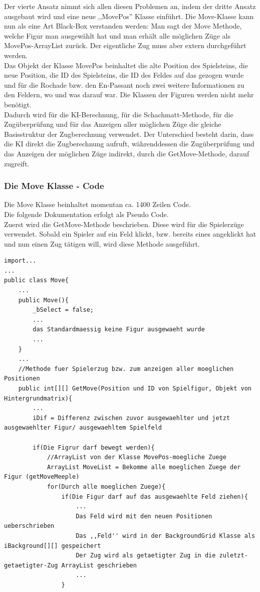 \documentclass[12pt,a4paper]{article}
\begin{document}
{Der vierte Ansatz nimmt sich allen diesen Problemen an, indem der dritte Ansatz ausgebaut wird und eine neue ,,MovePos'' Klasse einführt. Die Move-Klasse kann nun als eine Art Black-Box verstanden werden: Man sagt der Move Methode, welche Figur man ausgewählt hat und man erhält alle möglichen Züge als MovePos-ArrayList zurück. Der eigentliche Zug muss aber extern durchgeführt werden. \\
Das Objekt der Klasse MovePos beinhaltet die alte Position des Spielsteins, die neue Position, die ID des Spielsteins, die ID des Feldes auf das gezogen wurde und für die Rochade bzw. den En-Passant noch zwei weitere Informationen zu den Feldern, wo und was darauf war. Die Klassen der Figuren werden nicht mehr benötigt. \\
Dadurch wird für die KI-Berechnung, für die Schachmatt-Methode, für die Zugüberprüfung und für das Anzeigen aller möglichen Züge die gleiche Basisstruktur der Zugberechnung verwendet. Der Unterschied besteht darin, dass die KI direkt die Zugberechnung aufruft, währenddessen die Zugüberprüfung und das Anzeigen der möglichen Züge indirekt, durch die GetMove-Methode, darauf zugreift.\\


\subsubsection{Die Move Klasse - Code}
\label{SUBSUBSEC:MOVECODE}


Die Move Klasse beinhaltet momentan ca. 1400 Zeilen Code. \\
Die folgende Dokumentation erfolgt als Pseudo Code. \\
Zuerst wird die GetMove-Methode beschrieben. Diese wird für die Spielerzüge verwendet. Sobald ein Spieler auf ein Feld klickt, bzw. bereits eines angeklickt hat und nun einen Zug tätigen will, wird diese Methode ausgeführt. \\

\lstset{language=Java}
\begin{lstlisting}
import...
...
public class Move{
	...
	public Move(){
		_bSelect = false;
		...
		das Standardmaessig keine Figur ausgewaeht wurde
		...
	}			
	...
	//Methode fuer Spielerzug bzw. zum anzeigen aller moeglichen Positionen
	public int[][] GetMove(Position und ID von Spielfigur, Objekt von Hintergrundmatrix){
		...
		iDif = Differenz zwischen zuvor ausgewaehlter und jetzt ausgewaehlter Figur/ ausgewaehltem Spielfeld
		
		if(Die Figrur darf bewegt werden){
			//ArrayList von der Klasse MovePos-moegliche Zuege
			ArrayList MoveList = Bekomme alle moeglichen Zuege der Figur (getMoveMeeple)
			for(Durch alle moeglichen Zuege){
				if(Die Figur darf auf das ausgewaehlte Feld ziehen){
					...
					Das Feld wird mit den neuen Positionen ueberschrieben
					Das ,,Feld'' wird in der BackgroundGrid Klasse als iBackground[][] gespeichert
					Der Zug wird als getaetigter Zug in die zuletzt-getaetigter-Zug ArrayList geschrieben
					...		
				}
				

\end{lstlisting}}
\end{document}
